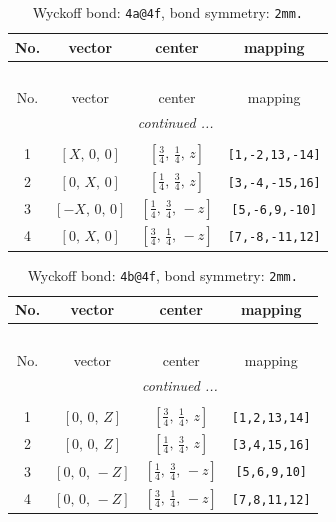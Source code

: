 \documentclass[fleqn,8pt]{jsarticle}
\begin{document}
\begin{longtable}{cccc}
\caption{Wyckoff bond: {\tt 4a@4f}, bond symmetry: {\tt 2mm.}}
 \\
 \hline \hline
No. & vector & center & mapping \\ \hline \endfirsthead

\multicolumn{3}{l}{\tablename\ \thetable{}} \\
 \hline \hline
No. & vector & center & mapping \\ \hline \endhead

 \hline \hline
\multicolumn{3}{r}{\footnotesize\it continued ...} \\ \endfoot

 \hline \hline
\multicolumn{3}{r}{} \\ \endlastfoot

1 & $\left[ X,\, 0,\, 0 \right]$ & $\left[ \frac{3}{4},\, \frac{1}{4},\, z \right]$ & {\tt [1,-2,13,-14]} \\ \hline
2 & $\left[ 0,\, X,\, 0 \right]$ & $\left[ \frac{1}{4},\, \frac{3}{4},\, z \right]$ & {\tt [3,-4,-15,16]} \\ \hline
3 & $\left[ - X,\, 0,\, 0 \right]$ & $\left[ \frac{1}{4},\, \frac{3}{4},\, - z \right]$ & {\tt [5,-6,9,-10]} \\ \hline
4 & $\left[ 0,\, X,\, 0 \right]$ & $\left[ \frac{3}{4},\, \frac{1}{4},\, - z \right]$ & {\tt [7,-8,-11,12]} \\
\end{longtable}
\renewcommand{\arraystretch}{1.2}
\begin{longtable}{cccc}
\caption{Wyckoff bond: {\tt 4b@4f}, bond symmetry: {\tt 2mm.}}
 \\
 \hline \hline
No. & vector & center & mapping \\ \hline \endfirsthead

\multicolumn{3}{l}{\tablename\ \thetable{}} \\
 \hline \hline
No. & vector & center & mapping \\ \hline \endhead

 \hline \hline
\multicolumn{3}{r}{\footnotesize\it continued ...} \\ \endfoot

 \hline \hline
\multicolumn{3}{r}{} \\ \endlastfoot

1 & $\left[ 0,\, 0,\, Z \right]$ & $\left[ \frac{3}{4},\, \frac{1}{4},\, z \right]$ & {\tt [1,2,13,14]} \\ \hline
2 & $\left[ 0,\, 0,\, Z \right]$ & $\left[ \frac{1}{4},\, \frac{3}{4},\, z \right]$ & {\tt [3,4,15,16]} \\ \hline
3 & $\left[ 0,\, 0,\, - Z \right]$ & $\left[ \frac{1}{4},\, \frac{3}{4},\, - z \right]$ & {\tt [5,6,9,10]} \\ \hline
4 & $\left[ 0,\, 0,\, - Z \right]$ & $\left[ \frac{3}{4},\, \frac{1}{4},\, - z \right]$ & {\tt [7,8,11,12]} \\
\end{longtable}
\end{document}

